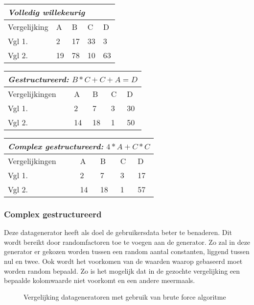 \documentclass[Main.tex]{subfiles}
\begin{document}
\begin{center}
\begin{tabular}{@{} *5l @{}}    \toprule
\multicolumn{5}{l}{\emph{Volledig willekeurig}}\\\midrule
 Vergelijking & A  & B  & C  & D  \\ 
 Vgl 1. & 2 & 17 & 33 & 3\\ 
 Vgl 2. & 19 & 78 & 10 & 63\\\bottomrule
 \hline
\end{tabular}

\begin{tabular}{@{} *5l @{}}    \toprule
\multicolumn{5}{l}{\emph{Gestructureerd: } $B*C+C+A = D$} \\ \midrule
 Vergelijkingen & A  & B  & C  & D  \\ 
 Vgl 1. & 2 & 7 & 3 & 30\\ 
 Vgl 2. & 14 & 18 & 1 & 50\\\bottomrule
 \hline
\end{tabular}

\begin{tabular}{@{} *5l @{}}    \toprule
\multicolumn{5}{l}{\emph{Complex gestructureerd:}  $4*A+C*C$}\\\midrule
 Vergelijkingen & A  & B  & C  & D  \\ 
 Vgl 1. & 2 & 7 & 3 & 17\\ 
 Vgl 2. & 14 & 18 & 1 & 57\\\bottomrule
 \hline
\end{tabular}
\end{center}

\subsubsection*{Complex gestructureerd}
Deze datagenerator heeft als doel de gebruikersdata beter te benaderen. Dit wordt bereikt door randomfactoren toe te voegen aan de generator. Zo zal in deze generator er gekozen worden tussen een random aantal constanten, liggend tussen nul en twee. Ook wordt het voorkomen van de waarden waarop gebaseerd moet worden random bepaald. Zo is het mogelijk dat in de gezochte vergelijking een bepaalde kolomwaarde niet voorkomt en een andere meermaals.

\begin{figure}
\centering
\caption{Vergelijking datageneratoren met gebruik van brute force algoritme} \label{fig:datageneratoren}
\end{figure}
\end{document}
